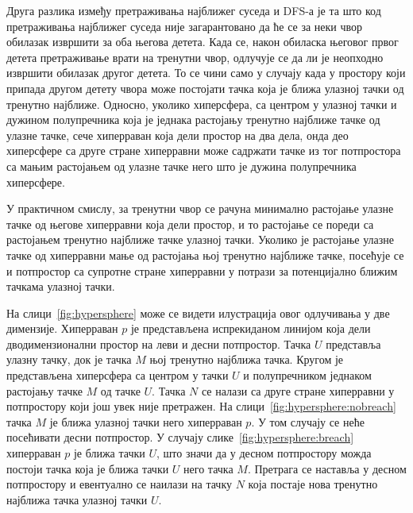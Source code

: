 \documentclass[master]{finthesis}
\begin{document}
Друга разлика између претраживања најближег суседа и DFS-а је та што код претраживања најближег суседа није загарантовано да ће се за неки чвор обилазак извршити за оба његова детета. Када се, након обиласка његовог првог детета претраживање врати на тренутни чвор, одлучује се да ли је неопходно извршити обилазак другог детета. То се чини само у случају када у простору који припада другом детету чвора може постојати тачка која је ближа улазној тачки од тренутно најближе. Односно, уколико хиперсфера, са центром у улазној тачки и дужином полупречника која је једнака растојању тренутно најближе тачке од улазне тачке, сече хиперраван која дели простор на два дела, онда део хиперсфере са друге стране хиперравни може садржати тачке из тог потпростора са мањим растојањем од улазне тачке него што је дужина полупречника хиперсфере.

У практичном смислу, за тренутни чвор се рачуна минимално растојање улазне тачке од његове хиперравни која дели простор, и то растојање се пореди са растојањем тренутно најближе тачке улазној тачки. Уколико је растојање улазне тачке од хиперравни мање од растојања њој тренутно најближе тачке, посећује се и потпростор са супротне стране хиперравни у потрази за потенцијално ближим тачкама улазној тачки.

На слици~\ref{fig:hypersphere} може се видети илустрација овог одлучивања у две димензије. Хиперраван $p$ је представљена испрекиданом линијом која дели дводимензионални простор на леви и десни потпростор. Тачка $U$ представља улазну тачку, док је тачка $M$ њој тренутно најближа тачка. Кругом је представљена хиперсфера са центром у тачки $U$ и полупречником једнаком растојању тачке $M$ од тачке $U$. Тачка $N$ се налази са друге стране хиперравни у потпростору који још увек није претражен. На слици~\ref{fig:hypersphere:nobreach} тачка $M$ је ближа улазној тачки него хиперраван $p$. У том случају се неће посећивати десни потпростор. У случају слике~\ref{fig:hypersphere:breach} хиперраван $p$ је ближа тачки $U$, што значи да у десном потпростору можда постоји тачка која је ближа тачки $U$ него тачка $M$. Претрага се наставља у десном потпростору и евентуално се наилази на тачку $N$ која постаје нова тренутно најближа тачка улазној тачки $U$.
\end{document}
